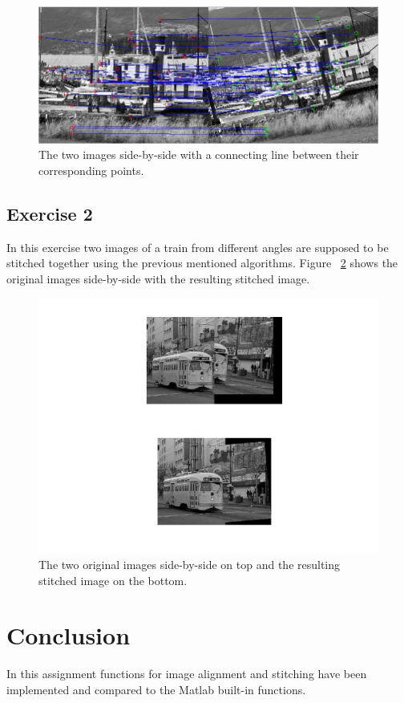 \documentclass[11pt]{article}
\begin{document}
\begin{figure}[h!]
\begin{flushleft}
\includegraphics[scale=0.7]{side_by_side.jpg}
\caption{The two images side-by-side with a connecting line between their corresponding points.}
\label{side_by_side}
\end{flushleft}
\end{figure}

\subsection{Exercise 2}
In this exercise two images of a train from different angles are supposed to be stitched together using the previous mentioned algorithms. Figure ~\ref{stitched} shows the original images side-by-side with the resulting stitched image.

\begin{figure}[h!]
\begin{flushleft}
\includegraphics[scale=0.4]{stich.jpg}
\caption{The two original images side-by-side on top and the resulting stitched image on the bottom.}
\label{stitched}
\end{flushleft}
\end{figure}

\section{Conclusion}
In this assignment functions for image alignment and stitching have been implemented and compared to the Matlab built-in functions. 
\end{document}
